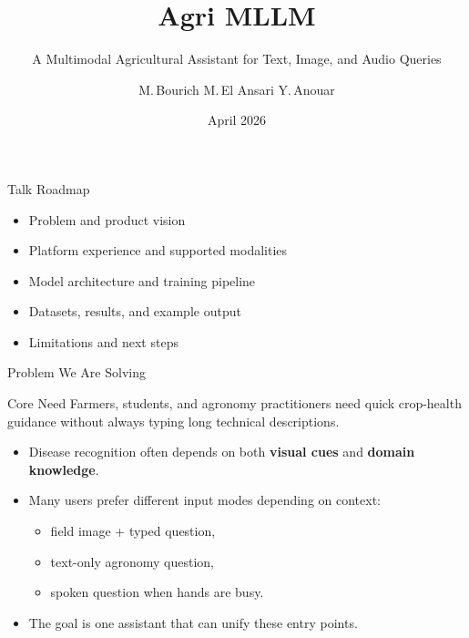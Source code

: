 \documentclass[aspectratio=169,11pt]{beamer}
\title{Agri MLLM}
\subtitle{A Multimodal Agricultural Assistant for Text, Image, and Audio Queries}
\author{M.\,Bourich \quad M.\,El Ansari \quad Y.\,Anouar}
\date{April 2026}
\begin{document}
{
\begin{frame}[plain]
    \titlepage
    \vspace{-0.6em}
    
\end{frame}
}

\begin{frame}{Talk Roadmap}
\begin{itemize}
    \item Problem and product vision
    \item Platform experience and supported modalities
    \item Model architecture and training pipeline
    \item Datasets, results, and example output
    \item Limitations and next steps
\end{itemize}
\end{frame}

\begin{frame}{Problem We Are Solving}
\begin{block}{Core Need}
Farmers, students, and agronomy practitioners need quick crop-health guidance without always typing long technical descriptions.
\end{block}
\vspace{0.4em}
\begin{itemize}
    \item Disease recognition often depends on both \textbf{visual cues} and \textbf{domain knowledge}.
    \item Many users prefer different input modes depending on context:
    \begin{itemize}
        \item field image + typed question,
        \item text-only agronomy question,
        \item spoken question when hands are busy.
    \end{itemize}
    \item The goal is one assistant that can unify these entry points.
\end{itemize}
\end{frame}
\end{document}
